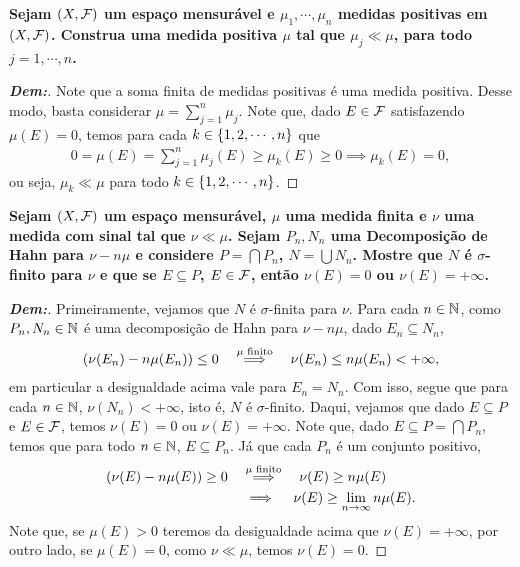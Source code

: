 \textbf{Sejam $(X, \mathcal F)$ um espaço mensurável e $\mu_1, \cdots, \mu_n$ 
medidas positivas em $(X, \mathcal F)$. Construa uma medida positiva $\mu$
tal que $\mu_j \ll \mu$, para todo $j = 1, \cdots, n$.}
\begin{proof}[\textbf{Dem:}] Note que a soma finita de medidas positivas 
  é uma medida positiva. Desse modo, basta considerar $\mu = \sum_{j=1}^n \mu_j$. 
  Note que, dado $E \in \mathcal F$ satisfazendo $\mu(E) = 0$, temos 
  para cada $k \in \left\{1, 2, \cdots, n\right\}$ que
  \begin{align*}
    0 = \mu(E) = \sum_{j = 1}^n \mu_j (E) \ge \mu_k (E) \ge 0 \implies \mu_k(E) = 0,
  \end{align*}
  ou seja, $\mu_k \ll \mu$ para todo $k \in \left\{1, 2, \cdots, n\right\}$.
\end{proof}

\textbf{Sejam $(X, \mathcal F)$ um espaço mensurável, $\mu$ uma medida finita e 
$\nu$ uma medida com sinal tal que $\nu \ll \mu$. Sejam $P_n, N_n$ 
uma Decomposição de Hahn para $\nu - n \mu$ e considere $P = \bigcap P_n$, 
$N = \bigcup N_n$. Mostre que $N$ é $\sigma$-finito para $\nu$ e 
que se $E\subseteq P$, $E \in \mathcal F$, então $\nu(E) = 0$ ou $\nu(E) = +\infty$.}
\begin{proof}[\textbf{Dem:}] Primeiramente, vejamos que 
  $N$ é $\sigma$-finita para $\nu$. Para cada $n \in \mathbb N$, como $P_n, N_n \in \mathbb N$
  é uma decomposição de Hahn para $\nu - n\mu$, dado $E_n \subseteq N_n$,
  \begin{align*}
    (\nu(E_n) - n\mu(E_n)) \le 0\quad 
    \overset{\text{$\mu$ finito}}{\implies} \quad \nu(E_n) \le n \mu(E_n) <+\infty,
  \end{align*}
  em particular a desigualdade acima vale para $E_n = N_n$. Com isso, 
  segue que para cada $n \in \mathbb N$, $\nu(N_n) < +\infty$, isto é, $N$ é $\sigma$-finito.
  Daqui, vejamos que dado $E \subseteq P$ e $E \in \mathcal F$, temos $\nu(E) = 0$
  ou $\nu(E) = +\infty$. Note que, dado $E \subseteq P = \bigcap P_n$, temos 
  que para todo $n \in \mathbb N$, $E \subseteq P_n$. Já que cada $P_n$ é um conjunto 
  positivo, 
  \begin{align*}
    \left(\nu(E) - n \mu(E)\right) \ge 0 \quad &\overset{\text{$\mu$ finito}}{\implies} \quad
    \nu(E) \ge n \mu(E) \\
    &\implies \quad \nu(E) \ge \lim_{n \rightarrow \infty} n\mu(E).
  \end{align*}
  Note que, se $\mu(E)>0$ teremos da desigualdade acima que $\nu(E) = +\infty$,
  por outro lado, se $\mu(E) = 0$, como $\nu \ll \mu$, temos $\nu(E) = 0$.
\end{proof}

